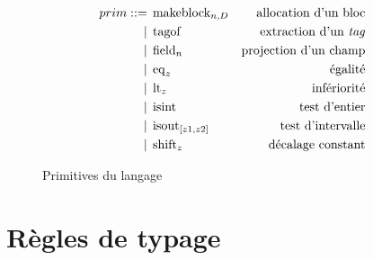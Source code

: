\begin{figure}
\begin{align*}
  prim ::=& \; \operatorname{makeblock}_{n,D}
    & \text{allocation d'un bloc}
  \\ |& \; \operatorname{tagof}
    & \text{extraction d'un \emph{tag}}
  \\ |& \; \operatorname{field}_{n}
    & \text{projection d'un champ}
  \\ |& \; \operatorname{eq}_{z}
    & \text{égalité}
  \\ |& \; \operatorname{lt}_{z}
    & \text{infériorité}
  \\ |& \; \operatorname{isint}
    & \text{test d'entier}
  \\ |& \; \operatorname{isout}_{[z1,z2]}
    & \text{test d'intervalle}
  \\ |& \; \operatorname{shift}_{z}
    & \text{décalage constant}
\end{align*}
\caption{Primitives du langage}
\end{figure}

\pagebreak

\section{Règles de typage}


